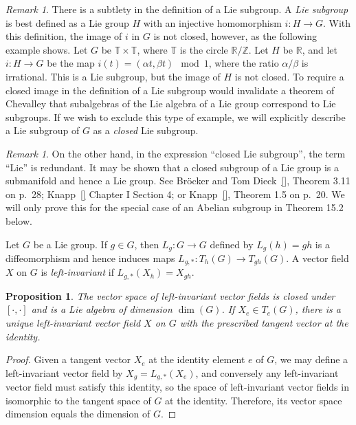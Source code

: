 \documentclass[12pt,reqno]{book}%
\newtheorem{proposition}{Proposition}[chapter]
\theoremstyle{definition}
\theoremstyle{remark}
\newtheorem{remark}[theorem]{Remark}
\theoremstyle{theorem}
\theoremstyle{remark}
\begin{document}
\begin{remark}\label{rem7.1}%
    There is a subtlety in the definition of a Lie subgroup.
    A \emph{Lie subgroup} is best defined as a Lie group $H$ with an injective homomorphism $i : H \to G$.
    With this definition, the image of $i$ in $G$ is not closed, however, as the following example shows.
    Let $G$ be $\mathbb{T} \times \mathbb{T}$, where $\mathbb{T}$ is the circle $\mathbb{R}/\mathbb{Z}$.
    Let $H$ be $\mathbb{R}$, and let $i : H \to G$ be the map $i(t) = (\alpha t, \beta t) \mod 1$, where the ratio $\alpha/\beta$ is irrational.
    This is a Lie subgroup, but the image of $H$ is not closed.
    To require a closed image in the definition of a Lie subgroup would invalidate a theorem of Chevalley that subalgebras of the Lie algebra of a Lie group correspond to Lie subgroups.
    If we wish to exclude this type of example, we will explicitly describe a Lie subgroup of $G$ as a \emph{closed} Lie subgroup.
\end{remark}%
\begin{remark}\label{rem7.2}%
    On the other hand, in the expression ``closed Lie subgroup'', the term ``Lie'' is redundant.
    It may be shown that a closed subgroup of a Lie group is a submanifold and hence a Lie group.
    See Br\"{o}cker and Tom Dieck~\ref{}, Theorem 3.11 on p.\ 28; Knapp~\ref{} Chapter I Section 4; or Knapp~\ref{}, Theorem 1.5 on p.\ 20.
    We will only prove this for the special case of an Abelian subgroup in Theorem 15.2 below.

    Let $G$ be a Lie group.
    If $g \in G$, then $L_g : G \to G$ defined by $L_g(h) = gh$ is a diffeomorphism and hence induces maps $L_{g, *} : T_h(G) \to T_{gh}(G)$.
    A vector field $X$ on $G$ is \emph{left-invariant} if $L_{g, *}(X_h) = X_{gh}$.
\end{remark}%

\begin{proposition}\label{prop7.1}%
    The vector space of left-invariant vector fields is closed under $[\cdot, \cdot]$ and is a Lie algebra of dimension $\dim(G)$.
    If $X_e \in T_e(G)$, there is a unique left-invariant vector field $X$ on $G$ with the prescribed tangent vector at the identity.
\end{proposition}%
\begin{proof}%
    Given a tangent vector $X_e$ at the identity element $e$ of $G$, we may define a left-invariant vector field by $X_g = L_{g, *}(X_e)$, and conversely any left-invariant vector field must satisfy this identity, so the space of left-invariant vector fields in isomorphic to the tangent space of $G$ at the identity.
    Therefore, its vector space dimension equals the dimension of $G$.
\end{proof}%
\end{document}
